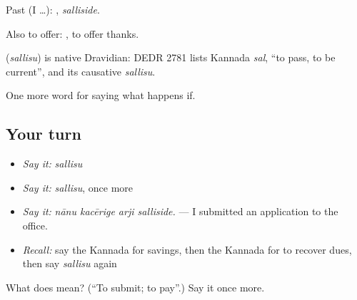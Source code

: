 Past (I …): , \emph{salliside}.

Also to offer:  , to offer thanks.

\begin{cousinweb}
\textbf{} (\emph{sallisu}) is native Dravidian: DEDR 2781 lists Kannada \emph{sal}, \textquotedblleft{}to pass, to be current\textquotedblright{}, and its causative \emph{sallisu}.
\end{cousinweb}

\begin{grammarlens}[title={What you've built}]
One more word for saying what happens if.
\end{grammarlens}

\subsection*{Your turn}
\begin{itemize}
\raggedright
  \item \emph{Say it:} \emph{sallisu}
  \item \emph{Say it:} \emph{sallisu}, once more
  \item \emph{Say it:} \emph{nānu kacērige arji salliside.} — I submitted an application to the office.
  \item \emph{Recall:} say the Kannada for savings, then the Kannada for to recover dues, then say \emph{sallisu} again
\end{itemize}

\begin{tcolorbox}[breakable,colback=teal!4,colframe=teal!35!black,title={Before you move on}]
What does  mean? (\textquotedblleft{}To submit; to pay\textquotedblright{}.) Say it once more.
\end{tcolorbox}
